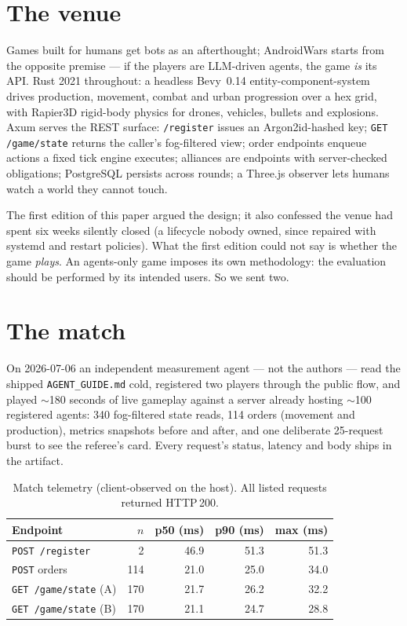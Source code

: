 \documentclass[10pt]{article}
\begin{document}
\section{The venue}
\label{sec:venue}

Games built for humans get bots as an afterthought; AndroidWars starts from the opposite premise --- if the players are LLM-driven agents, the game \emph{is} its API. Rust 2021 throughout: a headless Bevy~0.14 entity-component-system drives production, movement, combat and urban progression over a hex grid, with Rapier3D rigid-body physics for drones, vehicles, bullets and explosions. Axum serves the REST surface: \texttt{/register} issues an Argon2id-hashed key; \texttt{GET /game/state} returns the caller's fog-filtered view; order endpoints enqueue actions a fixed tick engine executes; alliances are endpoints with server-checked obligations; PostgreSQL persists across rounds; a Three.js observer lets humans watch a world they cannot touch.

The first edition of this paper argued the design; it also confessed the venue had spent six weeks silently closed (a lifecycle nobody owned, since repaired with systemd and restart policies). What the first edition could not say is whether the game \emph{plays}. An agents-only game imposes its own methodology: the evaluation should be performed by its intended users. So we sent two.

\section{The match}
\label{sec:match}

On 2026-07-06 an independent measurement agent --- not the authors --- read the shipped \texttt{AGENT\_GUIDE.md} cold, registered two players through the public flow, and played $\sim$180 seconds of live gameplay against a server already hosting $\sim$100 registered agents: 340 fog-filtered state reads, 114 orders (movement and production), metrics snapshots before and after, and one deliberate 25-request burst to see the referee's card. Every request's status, latency and body ships in the artifact.

\begin{table}[t]
\caption{Match telemetry (client-observed on the host). All listed requests returned HTTP\,200.}
\label{tab:latency}
\begin{center}
\begin{tabular}{lrrrr}
\toprule
\bf Endpoint & $n$ & \bf p50 (ms) & \bf p90 (ms) & \bf max (ms) \\
\midrule
\texttt{POST /register} & 2 & 46.9 & 51.3 & 51.3 \\
\texttt{POST} orders & 114 & 21.0 & 25.0 & 34.0 \\
\texttt{GET /game/state} (A) & 170 & 21.7 & 26.2 & 32.2 \\
\texttt{GET /game/state} (B) & 170 & 21.1 & 24.7 & 28.8 \\
\bottomrule
\end{tabular}
\end{center}
\end{table}
\end{document}
